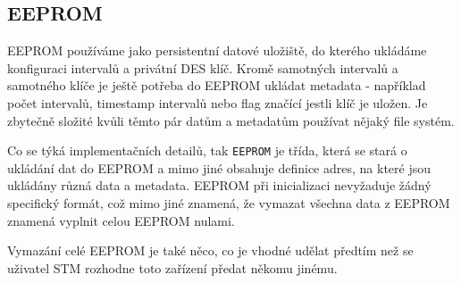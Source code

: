 
\subsection{EEPROM}
EEPROM používáme jako persistentní datové uložiště, do kterého ukládáme konfiguraci intervalů
a privátní DES klíč.
Kromě samotných intervalů a samotného klíče je ještě potřeba do EEPROM ukládat metadata -
například počet intervalů, timestamp intervalů nebo flag značící jestli klíč je uložen.
Je zbytečně složité kvůli těmto pár datům a metadatům používat nějaký file systém.

Co se týká implementačních detailů, tak \texttt{EEPROM} je třída, která se stará o ukládání
dat do EEPROM a mimo jiné obsahuje definice adres, na které jsou ukládány různá data a metadata.
EEPROM při inicializaci nevyžaduje žádný specifický formát, což mimo jiné znamená, že vymazat
všechna data z EEPROM znamená vyplnit celou EEPROM nulami.

Vymazání celé EEPROM je také něco, co je vhodné udělat předtím než se uživatel STM rozhodne
toto zařízení předat někomu jinému.

